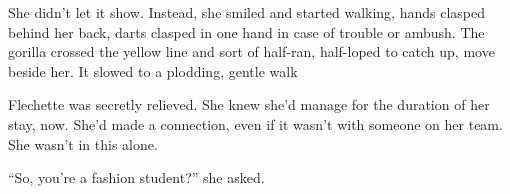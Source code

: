She didn't let it show.  Instead, she smiled and started walking, hands clasped behind her back, darts clasped in one hand in case of trouble or ambush.  The gorilla crossed the yellow line and sort of half-ran, half-loped to catch up, move beside her.  It slowed to a plodding, gentle walk



Flechette was secretly relieved.  She knew she'd manage for the duration of her stay, now.  She'd made a connection, even if it wasn't with someone on her team.  She wasn't in this alone.



``So, you're a fashion student?'' she asked.





